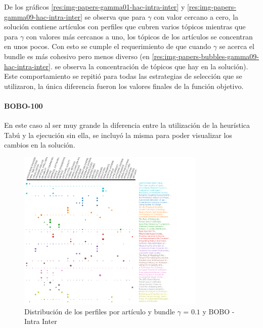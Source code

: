 De los gráficos \ref{res:img-papers-gamma01-hac-intra-inter} y \ref{res:img-papers-gamma09-hac-intra-inter} se observa que para $\gamma$ con valor cercano a cero, la solución contiene artículos con perfiles que cubren varios tópicos mientras que para $\gamma$ con valores más cercanos a uno, los tópicos de los artículos se concentran en unos pocos. Con esto se cumple el requerimiento de que cuando $\gamma$ se acerca el bundle es más cohesivo pero menos diverso (en \ref{res:img-papers-bubbles-gamma09-hac-intra-inter}. se observa la concentración de tópicos que hay en la solución).\\

Este comportamiento se repitió para todas las estrategias de selección que se utilizaron, la única diferencia fueron los valores finales de la función objetivo.
\paragraph{BOBO-100}
En este caso al ser muy grande la diferencia entre la utilización de la heurística Tabú y la ejecución sin ella,  se incluyó la misma para poder visualizar los cambios en la solución.
\begin{figure}[H]
  \centering
    \includegraphics[width=0.8\textwidth]{resultados/papers/BOBO/INTRA_INTER/gamma-01.png}
  \caption{Distribución de los perfiles por artículo y bundle $\gamma$ = $0.1$ y BOBO - Intra Inter}
  \label{res:img-papers-gamma01-bobo-intra-inter}
\end{figure}

